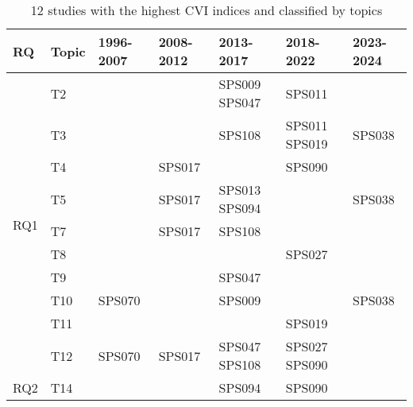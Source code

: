\begin{table*}[htbp]
    \renewcommand{\arraystretch}{1.3}
    \setlength{\tabcolsep}{3pt}
    \centering
    \caption{12 studies with the highest CVI indices and classified by topics}
    \begin{tabular}{p{0.8cm}p{0.9cm}p{2.7cm}p{2.7cm}p{2.7cm}p{2.7cm}p{1.7cm}}
        \hline
        \textbf{RQ} & \textbf{Topic} & \textbf{1996-2007} & \textbf{2008-2012} & \textbf{2013-2017} & \textbf{2018-2022} & \textbf{2023-2024} \\
        \hline
        \multirow{10}{*}{RQ1} & T2 &  &  & SPS009 SPS047 & SPS011 & \\
        & T3 &  &  & SPS108 & SPS011 SPS019 & SPS038 \\
        & T4 &  & SPS017 &  & SPS090 & \\
        & T5 &  & SPS017 & SPS013 SPS094 &  & SPS038 \\
        & T7 &  & SPS017 & SPS108 &  & \\
        & T8 &  &  &  & SPS027 & \\
        & T9 &  &  & SPS047 &  & \\
        & T10 & SPS070 &  & SPS009 &  & SPS038 \\
        & T11 &  &  &  & SPS019 & \\
        & T12 & SPS070 & SPS017 & SPS047 SPS108 & SPS027 SPS090 & \\
        \hline
        RQ2 & T14 &  &  & SPS094 & SPS090 & \\
        \hline
    \end{tabular}
    \label{table:highest_CVI}
\end{table*}

